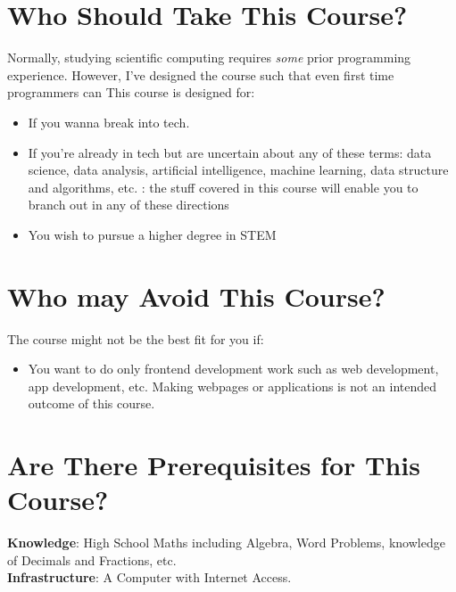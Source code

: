 \documentclass{article}
\begin{document}
\section{Who Should Take This Course?}
Normally, studying scientific computing requires \textit{some} prior programming experience. However, I've designed the course such that even first time programmers can  
This course is designed for:
\begin{itemize}
    \item If you wanna break into tech.
    \item If you're already in tech but are uncertain about any of these terms: data science, data analysis, artificial intelligence, machine learning, data structure and algorithms, etc. : the stuff covered in this course will enable you to branch out in any of these directions
    \item You wish to pursue a higher degree in STEM
\end{itemize}

\section{Who may Avoid This Course?}
The course might not be the best fit for you if:
\begin{itemize}
    \item You want to do only frontend development work such as web development, app development, etc. Making webpages or applications is not an intended outcome of this course. 
\end{itemize}

\section{Are There Prerequisites for This Course?}
\textbf{Knowledge}: High School Maths including Algebra, Word Problems, knowledge of Decimals and Fractions, etc. \\
\textbf{Infrastructure}: A Computer with Internet Access.
\end{document}
